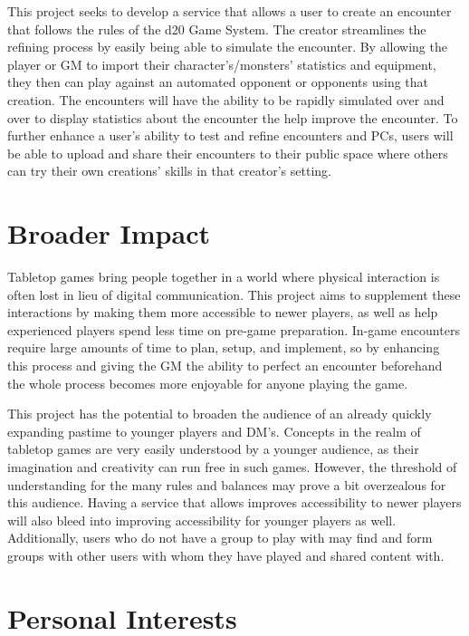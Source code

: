 \documentclass[12pt,a4paper]{report}
\begin{document}
This project seeks to develop a service that allows a user to create an encounter that follows the rules of the d20 Game System. The creator streamlines the refining process by easily being able to simulate the encounter. By allowing the player or GM to import their character's/monsters' statistics and equipment, they then can play against an automated opponent or opponents using that creation. The encounters will have the ability to be rapidly simulated over and over to display statistics about the encounter the help improve the encounter. To further enhance a user's ability to test and refine encounters and PCs, users will be able to upload and share their encounters to their public space where others can try their own creations' skills in that creator's setting.

\newpage
\chapter*{Broader Impact}

Tabletop games bring people together in a world where physical interaction is often lost in lieu of digital communication. This project aims to supplement these interactions by making them more accessible to newer players, as well as help experienced players spend less time on pre-game preparation. In-game encounters require large amounts of time to plan, setup, and implement, so by enhancing this process and giving the GM the ability to perfect an encounter beforehand the whole process becomes more enjoyable for anyone playing the game.

This project has the potential to broaden the audience of an already quickly expanding pastime to younger players and DM's. Concepts in the realm of tabletop games are very easily understood by a younger audience, as their imagination and creativity can run free in such games. However, the threshold of understanding for the many rules and balances may prove a bit overzealous for this audience. Having a service that allows improves accessibility to newer players will also bleed into improving accessibility for younger players as well. Additionally, users who do not have a group to play with may find and form groups with other users with whom they have played and shared content with.
	
\newpage
\chapter*{Personal Interests}
\end{document}
